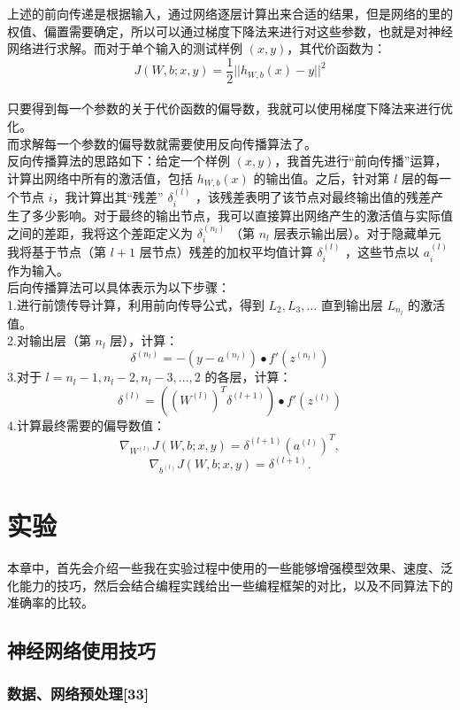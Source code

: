 上述的前向传递是根据输入，通过网络逐层计算出来合适的结果，但是网络的里的权值、偏置需要确定，所以可以通过梯度下降法来进行对这些参数，也就是对神经网络进行求解。而对于单个输入的测试样例
\((x,y)\)，其代价函数为：
\[J(W,b; x,y) = \frac{1}{2} || h_{W,b}(x) - y ||^2\]\\只要得到每一个参数的关于代价函数的偏导数，我就可以使用梯度下降法来进行优化。\\而求解每一个参数的偏导数就需要使用反向传播算法了。\\反向传播算法的思路如下：给定一个样例
\((x,y)\)，我首先进行``前向传播''运算，计算出网络中所有的激活值，包括
\(h_{W,b}(x)\) 的输出值。之后，针对第 \(l\) 层的每一个节点
\(i\)，我计算出其``残差'' \(\delta^{(l)}_i\)
，该残差表明了该节点对最终输出值的残差产生了多少影响。对于最终的输出节点，我可以直接算出网络产生的激活值与实际值之间的差距，我将这个差距定义为
\(\delta^{(n_l)}_i\) （第 \(n_l\)
层表示输出层）。对于隐藏单元我将基于节点（第 \(l+1\)
层节点）残差的加权平均值计算 \(\delta^{(l)}_i\) ，这些节点以
\(a^{(l)}_i\)
作为输入。\\后向传播算法可以具体表示为以下步骤：\\1.进行前馈传导计算，利用前向传导公式，得到
\(L_2, L_3, \ldots\) 直到输出层 \(L_{n_l}\) 的激活值。\\2.对输出层（第
\(n_l\) 层），计算：
\[\delta^{(n_l)} = - (y - a^{(n_l)}) \bullet f'(z^{(n_l)})\] 3.对于
\(l=n_l-1, n_l-2, n_l-3, \ldots, 2\) 的各层，计算：
\[\delta^{(l)} = \left((W^{(l)})^T \delta^{(l+1)}\right) \bullet f'(z^{(l)})\]
4.计算最终需要的偏导数值：
\[\nabla_{W^{(l)}} J(W,b;x,y) = \delta^{(l+1)}(a^{(l)})^T,\]
\[\nabla_{b^{(l)}} J(W,b;x,y) = \delta^{(l+1)}.\]

\section{实验}\label{ux5b9eux9a8c}

本章中，首先会介绍一些我在实验过程中使用的一些能够增强模型效果、速度、泛化能力的技巧，然后会结合编程实践给出一些编程框架的对比，以及不同算法下的准确率的比较。

\subsection{神经网络使用技巧}\label{ux795eux7ecfux7f51ux7edcux4f7fux7528ux6280ux5de7}

\subsubsection{数据、网络预处理{[}33{]}}\label{ux6570ux636eux7f51ux7edcux9884ux5904ux7406lecun2012}


